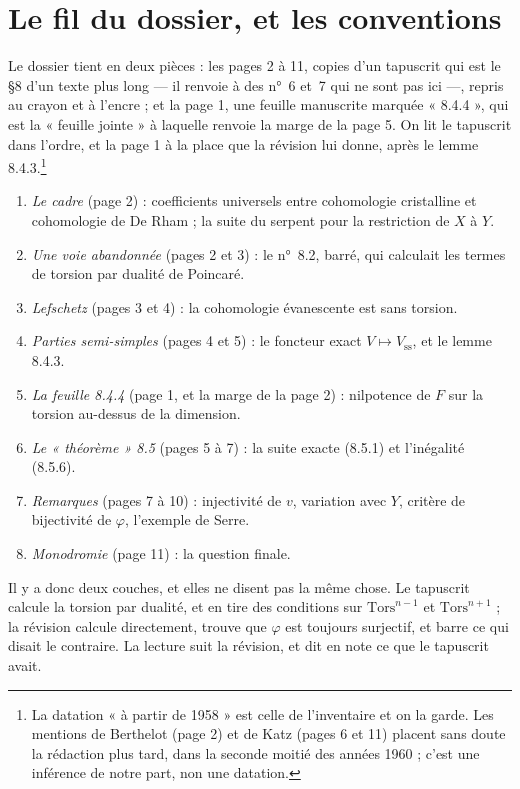 \documentclass[11pt,a4paper]{article}
\begin{document}
\section*{Le fil du dossier, et les conventions}

Le dossier tient en deux pièces : les pages 2 à 11, copies d'un tapuscrit
qui est le §8 d'un texte plus long --- il renvoie à des n°~6 et~7 qui ne sont
pas ici ---, repris au crayon et à l'encre ; et la page 1, une feuille
manuscrite marquée « 8.4.4 », qui est la « feuille jointe » à laquelle renvoie
la marge de la page 5. On lit le tapuscrit dans l'ordre, et la page 1 à la
place que la révision lui donne, après le lemme 8.4.3.\footnote{La datation
« à partir de 1958 » est celle de l'inventaire et on la garde. Les mentions de
Berthelot (page 2) et de Katz (pages 6 et 11) placent sans doute la rédaction
plus tard, dans la seconde moitié des années 1960 ; c'est une inférence de
notre part, non une datation.}

\begin{enumerate}
\item[1.] \emph{Le cadre} (page 2) : coefficients universels entre cohomologie
cristalline et cohomologie de De Rham ; la suite du serpent pour la
restriction de $X$ à $Y$.
\item[2.] \emph{Une voie abandonnée} (pages 2 et 3) : le n°~8.2, barré, qui
calculait les termes de torsion par dualité de Poincaré.
\item[3.] \emph{Lefschetz} (pages 3 et 4) : la cohomologie évanescente est
sans torsion.
\item[4.] \emph{Parties semi-simples} (pages 4 et 5) : le foncteur exact
$V \mapsto V_{\mathrm{ss}}$, et le lemme 8.4.3.
\item[5.] \emph{La feuille 8.4.4} (page 1, et la marge de la page 2) :
nilpotence de $F$ sur la torsion au-dessus de la dimension.
\item[6.] \emph{Le « théorème » 8.5} (pages 5 à 7) : la suite exacte (8.5.1)
et l'inégalité (8.5.6).
\item[7.] \emph{Remarques} (pages 7 à 10) : injectivité de $v$, variation
avec $Y$, critère de bijectivité de $\varphi$, l'exemple de Serre.
\item[8.] \emph{Monodromie} (page 11) : la question finale.
\end{enumerate}

Il y a donc deux couches, et elles ne disent pas la même chose. Le tapuscrit
calcule la torsion par dualité, et en tire des conditions sur
$\mathrm{Tors}^{n-1}$ et $\mathrm{Tors}^{n+1}$ ; la révision calcule
directement, trouve que $\varphi$ est toujours surjectif, et barre ce qui
disait le contraire. La lecture suit la révision, et dit en note ce que le
tapuscrit avait.
\end{document}
